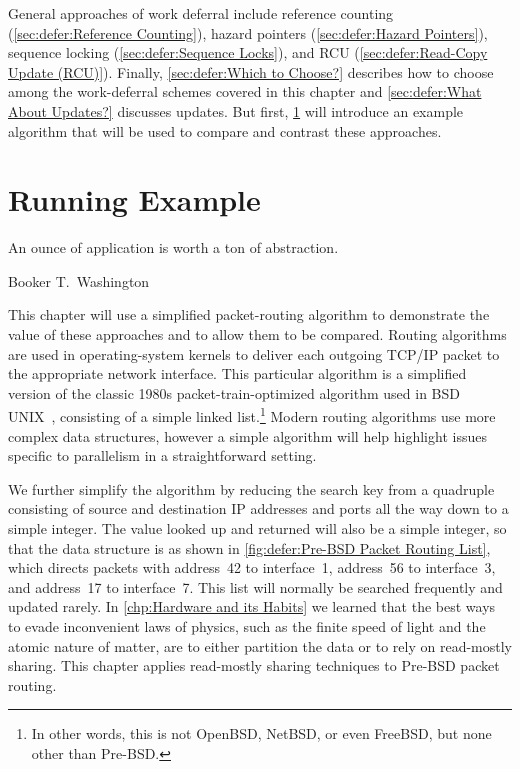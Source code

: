 General approaches of work deferral include
reference counting (\cref{sec:defer:Reference Counting}),
hazard pointers (\cref{sec:defer:Hazard Pointers}),
sequence locking (\cref{sec:defer:Sequence Locks}),
and RCU (\cref{sec:defer:Read-Copy Update (RCU)}).
Finally, \cref{sec:defer:Which to Choose?}
describes how to choose among the work-deferral schemes covered in
this chapter and \cref{sec:defer:What About Updates?}
discusses updates.
But first, \cref{sec:defer:Running Example} will introduce an example
algorithm that will be used to compare and contrast these approaches.

\section{Running Example}
\label{sec:defer:Running Example}
%
\epigraph{An ounce of application is worth a ton of abstraction.}
	 {Booker T.~Washington}

This chapter will use a simplified packet-routing algorithm to demonstrate
the value of these approaches and to allow them to be compared.
Routing algorithms are used in operating-system kernels to
deliver each outgoing TCP/IP packet to the appropriate network interface.
This particular algorithm is a simplified version of the classic 1980s
packet-train-optimized algorithm used in BSD UNIX~\cite{VanJacobson88},
consisting of a simple linked list.\footnote{
	In other words, this is not OpenBSD, NetBSD, or even
	FreeBSD, but none other than Pre-BSD\@.}
Modern routing algorithms use more complex data structures, however a
simple algorithm will help highlight issues specific to parallelism in
a straightforward setting.

We further simplify the algorithm by reducing the search key from
a quadruple consisting of source and destination IP addresses and
ports all the way down to a simple integer.
The value looked up and returned will also be a simple integer,
so that the data structure is as shown in
\cref{fig:defer:Pre-BSD Packet Routing List}, which
directs packets with address~42 to interface~1, address~56 to
interface~3, and address~17 to interface~7.
This list will normally be searched frequently and updated rarely.
In \cref{chp:Hardware and its Habits}
we learned that the best ways to evade inconvenient laws of physics, such as
the finite speed of light and the atomic nature of matter, are to
either partition the data or to rely on read-mostly sharing.
This chapter applies read-mostly sharing techniques to Pre-BSD packet
routing.

